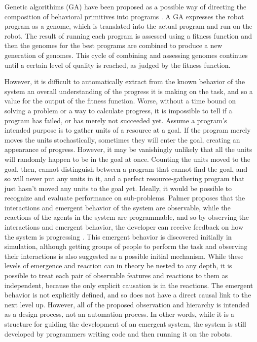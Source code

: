 \documentclass[]{article}
\begin{document}
Genetic algorithims (GA) have been proposed as a possible way of directing the composition of behavioral primitives into programs \cite{palmer2005emergence}.
A GA expresses the robot program as a genome, which is translated into the actual program and run on the robot. 
The result of running each program is assessed using a fitness function and then the genomes for the best programs are combined to produce a new generation of genomes. 
This cycle of combining and assessing genomes continues until a certain level of quality is reached, as judged by the fitness function.

However, it is difficult to automatically extract from the known behavior of the system an overall understanding of the progress it is making on the task, and so a value for the output of the fitness function. 
Worse, without a time bound on solving a problem or a way to calculate progress, it is impossible to tell if a program has failed, or has merely not succeeded yet.
Assume a program's intended purpose is to gather units of a resource at a goal. 
If the program merely moves the units stochastically, sometimes they will enter the goal, creating an appearance of progress. 
However, it may be vanishingly unlikely that all the units will randomly happen to be in the goal at once. 
Counting the units moved to the goal, then, cannot distinguish between a program that cannot find the goal, and so will never put any units in it, and a perfect resource-gathering program that just hasn't moved any units to the goal yet. 
Ideally, it would be possible to recognize and evaluate performance on sub-problems. 
Palmer proposes that the interactions and emergent behavior of the system are observable, while the reactions of the agents in the system are programmable, and so by observing the interactions and emergent behavior, the developer can receive feedback on how the system is progressing \cite{palmer2005behavioral}. 
This emergent behavior is discovered initially in simulation, although getting groups of people to perform the task and observing their interactions is also suggested as a possible initial mechanism.
While these levels of emergence and reaction can in theory be nested to any depth, it is possible to treat each pair of observable features and reactions to them as independent, because the only explicit causation is in the reactions. 
The emergent behavior is not explicitly defined, and so does not have a direct causal link to the next level up. 
However, all of the proposed observation and hierarchy is intended as a design process, not an automation process. 
In other words, while it is a structure for guiding the development of an emergent system, the system is still developed by programmers writing code and then running it on the robots.
\end{document}
